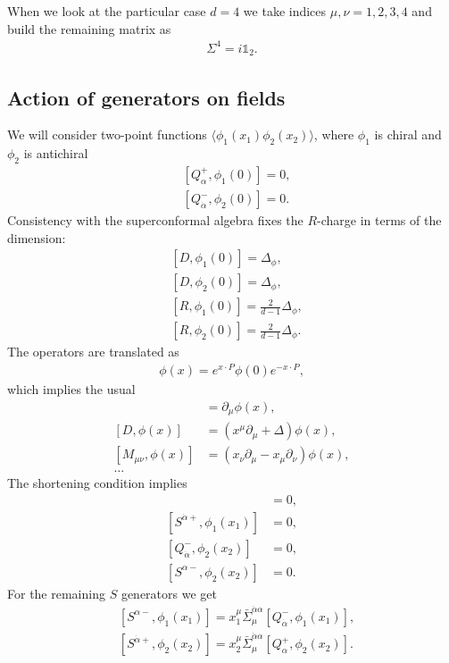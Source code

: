 \documentclass[letterpaper]{article}
\let\Oldsubsection\subsection
\renewcommand{\subsection}{\FloatBarrier\Oldsubsection}
\def\a{{\alpha}}
\def\ad{{\dot{\alpha}}}
\begin{document}
When we look at the particular case $d = 4$ we take indices $\mu,\nu = 1, 2, 3, 4$ and build the remaining matrix as
\begin{align}
 \Sigma^4 = i \mathds{1}_{2}.
\end{align}

\subsection{Action of generators on fields}

We will consider two-point functions $\langle \phi_1(x_1) \phi_2(x_2) \rangle$, where $\phi_1$ is chiral and $\phi_2$ is antichiral
\begin{align}
 & [Q^+_\a,  \phi_1(0)] = 0, \\
 & [Q^-_\ad, \phi_2(0)] = 0.
\end{align}
Consistency with the superconformal algebra fixes the $R$-charge in terms of the dimension:
\begin{align}
 & [D, \phi_1(0)] = \Delta_\phi, \\
 & [D, \phi_2(0)] = \Delta_\phi, \\
 & [R, \phi_1(0)] = \frac{2}{d-1} \Delta_\phi, \\
 & [R, \phi_2(0)] = \frac{2}{d-1} \Delta_\phi.
\end{align}
The operators are translated as
\begin{align}
 \phi(x) = e^{x\cdot P} \phi(0) e^{-x\cdot P},
\end{align}
which implies the usual
\begin{align}
 [P_\mu, \phi(x)] & = \partial_\mu \phi(x), \\
 [D, \phi(x)] & =  (x^\mu \partial_\mu + \Delta) \phi(x), \\
 [M_{\mu\nu}, \phi(x)] & =  (x_\nu \partial_\mu - x_\mu \partial_\nu) \phi(x), \\
 \ldots
\end{align}
The shortening condition implies
\begin{align}
 [Q^+_\a,   \phi_1(x_1)] & = 0, \\
 [S^{\ad+}, \phi_1(x_1)] & = 0, \\
 [Q^-_\ad,  \phi_2(x_2)] & = 0, \\
 [S^{\a-},  \phi_2(x_2)] & = 0.
\end{align}
For the remaining $S$ generators we get
\begin{align}
 & [S^{\a-}, \phi_1(x_1)]
 = x_1^\mu \bar \Sigma_\mu^{\ad\a} [Q^-_\ad, \phi_1(x_1)], \\
 & [S^{\ad+}, \phi_2(x_2)]
 = x_2^\mu \bar \Sigma_\mu^{\ad\a} [Q^+_\a,  \phi_2(x_2)].
\end{align}
\end{document}
